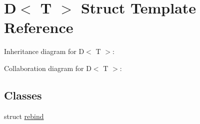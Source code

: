 \hypertarget{struct_d}{}\section{D$<$ T $>$ Struct Template Reference}
\label{struct_d}


Inheritance diagram for D$<$ T $>$\+:


Collaboration diagram for D$<$ T $>$\+:
\subsection*{Classes}
\begin{DoxyCompactItemize}
\item 
struct \mbox{\hyperlink{struct_d_1_1rebind}{rebind}}
\end{DoxyCompactItemize}
